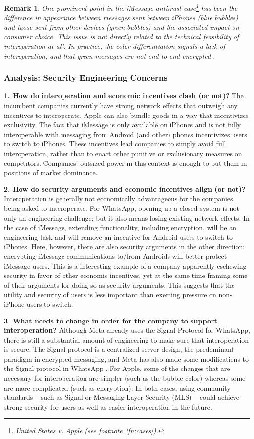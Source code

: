 \documentclass[letterpaper,twocolumn,10pt]{article}
\newtheorem{remark}[thm]{Remark}
\newcommand{\qone}{How do interoperation and economic incentives clash
(or not)?\xspace}
\newcommand{\qtwo}{How do security arguments and economic incentives align (or not)?\xspace}
\newcommand{\qthree}{What needs to change in order for the company to support interoperation?\xspace}
\newcommand{\question}[1]{\smallskip \noindent \textbf{{#1}}}
\begin{document}
\begin{remark}
One prominent point in the iMessage antitrust case\footnote{United States v. Apple (see footnote~\ref{fn:cases}).} has been the difference in appearance between messages sent between iPhones (blue bubbles) and those sent from other devices (green bubbles) \cite{imessage_doj} and the associated impact on consumer choice. This issue is not directly related to the technical feasibility of interoperation at all. In practice, the color differentiation signals a lack of interoperation, and that green messages are not end-to-end-encrypted \cite{ross_econ, apple_bubbles}. 
\end{remark}

\subsubsection{Analysis: Security Engineering Concerns}

\question{1. \qone}
The incumbent companies currently have strong network effects that outweigh any incentives to interoperate. Apple can also bundle goods in a way that incentivizes exclusivity. The fact that iMessage is only available on iPhones and is not fully interoperable with messaging from Android (and other) phones incentivizes users to switch to iPhones.  These incentives lead companies to simply avoid full interoperation, rather than to enact other punitive or exclusionary measures on competitors. Companies' outsized power in this context is enough to put them in positions of market dominance.

\question{2. \qtwo} Interoperation is generally not economically advantageous for the companies being asked to interoperate. For WhatsApp, opening up a closed system is not only an engineering challenge; but it also means losing existing network effects. 
In the case of iMessage, extending functionality, including encryption, will be an engineering task and will remove an incentive for Android users to switch to iPhones.  Here, however, there are also security arguments in the other direction: encrypting iMessage communications to/from Androids will better protect iMessage users. This is a interesting example of a company apparently eschewing security in favor of other economic incentives, yet at the same time framing some of their arguments for doing so as security arguments. This suggests that the utility and security of users is less important than exerting pressure on non-iPhone users to switch.


\question{3. \qthree}
Although Meta already uses the Signal Protocol for WhatsApp, there is still a substantial amount of engineering to make sure that interoperation is secure. The Signal protocol is a centralized server design, the predominant paradigm in encrypted messaging, and Meta has also made some modifications to the Signal protocol in WhatsApp \cite{meta_interop}. For Apple, some of the changes that are necessary for interoperation are simpler (such as the bubble color) whereas some are more complicated (such as encryption). In both cases, using community standards -- such as Signal or Messaging Layer Security (MLS) -- could achieve strong security for users as well as easier interoperation in the future.
\end{document}
